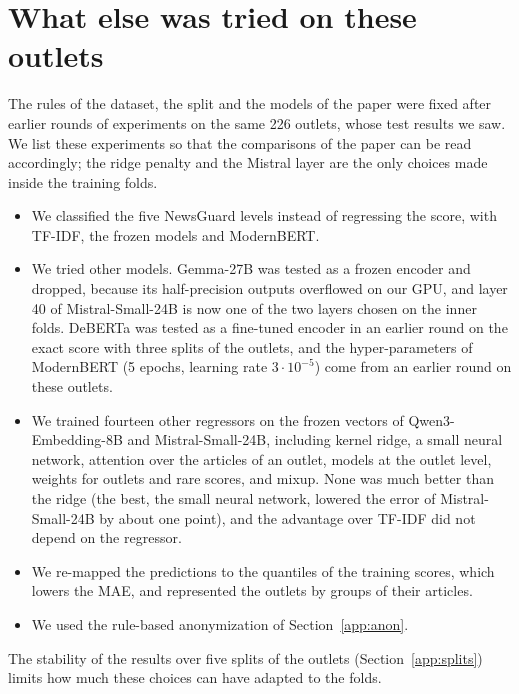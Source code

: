 \documentclass[11pt,a4paper]{article}
\begin{document}
\section{What else was tried on these outlets}\label{app:tried}
The rules of the dataset, the split and the models of the paper were fixed after earlier rounds of experiments on the
same 226 outlets, whose test results we saw. We list these experiments so that the comparisons of the paper can be read
accordingly; the ridge penalty and the Mistral layer are the only choices made inside the training folds.
\begin{itemize}
  \item We classified the five NewsGuard levels instead of regressing the score, with TF-IDF, the frozen models and
        ModernBERT.
  \item We tried other models. Gemma-27B was tested as a frozen encoder and dropped, because its half-precision outputs
        overflowed on our GPU, and layer 40 of Mistral-Small-24B is now one of the two layers chosen on the inner folds.
        DeBERTa was tested as a fine-tuned encoder in an earlier round on the exact score with three splits of the
        outlets, and the hyper-parameters of ModernBERT (5 epochs, learning rate $3 \cdot 10^{-5}$) come from an earlier
        round on these outlets.
  \item We trained fourteen other regressors on the frozen vectors of Qwen3-Embedding-8B and Mistral-Small-24B, including
        kernel ridge, a small neural network, attention over the articles of an outlet, models at the outlet level,
        weights for outlets and rare scores, and mixup. None was much better than the ridge (the best, the small neural
        network, lowered the error of Mistral-Small-24B by about one point), and the advantage over TF-IDF did not depend
        on the regressor.
  \item We re-mapped the predictions to the quantiles of the training scores, which lowers the MAE, and represented the
        outlets by groups of their articles.
  \item We used the rule-based anonymization of Section~\ref{app:anon}.
\end{itemize}
The stability of the results over five splits of the outlets (Section~\ref{app:splits}) limits how much these choices
can have adapted to the folds.
\end{document}
